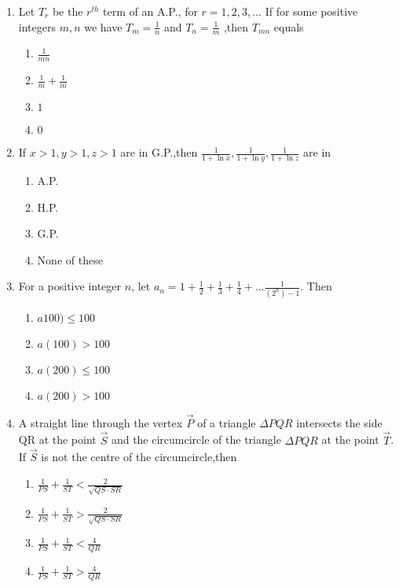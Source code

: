 \documentclass[journal]{IEEEtran}
\theoremstyle{remark}
\begin{document}
\begin{enumerate}
\item Let $T_r$ be the $r^{th}$ term of an A.P., for $r=1,2,3,\dots$ If for some positive integers $m,n$ we have
$T_m=\frac{1}{n}$ and $T_n=\frac{1}{m}$ ,then $T_{mn}$ equals \hfill{}

\begin{multicols}{4}
\begin{enumerate}
\item $\frac{1}{mn}$
\item $\frac{1}{m} + \frac{1}{m}$
\item $1$
\item $0$
\end{enumerate}
\end{multicols}

\item If $x>1,y>1,z>1$ are in G.P.,then $\frac{1}{1+\ln x},\frac{1}{1+\ln y},\frac{1}{1+\ln z}$ are in 
\hfill{}
\begin{multicols}{4}
\begin{enumerate}
\item A.P.
\item H.P.
\item G.P.
\item None of these
\end{enumerate}
\end{multicols}

\item For a positive integer $n$, let
$a_n=1+\frac{1}{2}+\frac{1}{3}+\frac{1}{4}+\dots\frac{1}{(2^n)-1}$. Then \hfill{}
\begin{multicols}{4}
\begin{enumerate}
\item $a100)\leq 100$
\item $a(100) > 100$
\item $a(200)\leq 100$
\item $a(200) > 100$
\end{enumerate}
\end{multicols}

\item A straight line through the vertex $\vec{P}$ of a triangle $\Delta PQR$ intersects the side QR at the point $\vec{S}$ and the circumcircle of the triangle $\Delta{PQR}$ at the point $\vec{T}$. If $\vec{S}$ is not the centre of the circumcircle,then  \hfill{}
\begin{multicols}{2}
\begin{enumerate}
\item $\frac{1}{PS}+\frac{1}{ST}<\frac{2}{\sqrt{QS \cdot SR}}$
\item $\frac{1}{PS}+\frac{1}{ST}>\frac{2}{\sqrt{QS \cdot SR}}$
\item $\frac{1}{PS}+\frac{1}{ST}<\frac{4}{QR}$
\item $\frac{1}{PS}+\frac{1}{ST}>\frac{4}{QR}$
\end{enumerate}
\end{multicols}


\end{enumerate}
\end{document}
